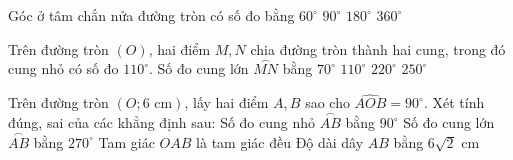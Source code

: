 
\begin{ex}%
	Góc ở tâm chắn nửa đường tròn có số đo bằng
	\choice
	{$60^\circ$}
	{$90^\circ$}
	{\True $180^\circ$}
	{$360^\circ$}
\end{ex}

\begin{ex}%
	Trên đường tròn $(O)$, hai điểm $M, N$ chia đường tròn thành hai cung, trong đó cung nhỏ có số đo $110^\circ$. Số đo cung lớn $\overset{\frown}{MN}$ bằng
	\choice
	{$70^\circ$}
	{$110^\circ$}
	{$220^\circ$}
	{\True $250^\circ$}
\end{ex}

\begin{ex}%
	Trên đường tròn $(O; 6\text{ cm})$, lấy hai điểm $A, B$ sao cho $\widehat{AOB} = 90^\circ$. Xét tính đúng, sai của các khẳng định sau:
	\choiceTF
	{\True Số đo cung nhỏ $\overset{\frown}{AB}$ bằng $90^\circ$}
	{\True Số đo cung lớn $\overset{\frown}{AB}$ bằng $270^\circ$}
	{Tam giác $OAB$ là tam giác đều}
	{\True Độ dài dây $AB$ bằng $6\sqrt{2}\text{ cm}$}
\end{ex}

